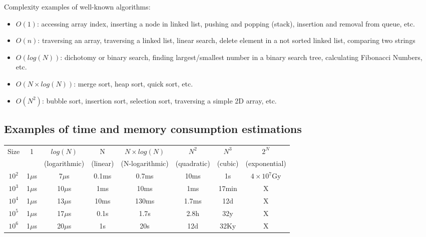 \documentclass{beamer}[10pt, usepdftitle=false, handout]
\begin{document}
	\begin{frame}
	
	Complexity examples of well-known algorithms:	
	
	\begin{itemize}
	
	\item{\textbf{$O(1)$}: accessing array index, inserting a node in linked list, pushing and popping (stack), insertion and removal from queue, etc.}

	\item{\textbf{$O(n)$}: traversing an array, traversing a linked list, linear search, delete element in a not sorted linked list, comparing two strings}

	\item{\textbf{$O(log(N))$}: dichotomy or binary search, finding largest/smallest number in a binary search tree,  calculating Fibonacci Numbers, etc.}

	\item{\textbf{$O(N\times log(N))$}: merge sort, heap sort, quick sort, etc.}

	\item{\textbf{$O(N^2)$}: bubble sort, insertion sort, selection sort, traversing a simple 2D array, etc.	}
	
	\end{itemize}
	
	
	\end{frame}
	
	\subsection{Examples of time and memory consumption estimations}	
	
	\begin{frame}	
	
	\begin{tabular}{ c | c | c | c | c | c | c | c }
	Size & 1 & $log(N)$ & N & $N \times log(N)$ & $N^2$ & $N^3$ & $2^N$ \\ 
	& & \tiny{(logarithmic)} & \tiny{(linear)} & \tiny{(N-logarithmic)} & \tiny({quadratic)} & \tiny{(cubic)}  & \tiny{(exponential)} \\ \hline
	$10^2$ & 1$\mu$s & 7$\mu$s & 0.1ms & 0.7ms & 10ms & 1s & $4\times 10^7$Gy \\
	$10^3$ & 1$\mu$s & 10$\mu$s & 1ms & 10ms & 1ms & 17min & X \\
	$10^4$ & 1$\mu$s & 13$\mu$s & 10ms & 130ms & 1.7ms & 12d & X \\		
	$10^5$ & 1$\mu$s & 17$\mu$s & 0.1s & 1.7s & 2.8h & 32y & X \\		
	$10^6$ & 1$\mu$s & 20$\mu$s & 1s & 20s & 12d & 32Ky & X \\	
	\end{tabular}	
	
	\end{frame}
	
\end{document}
